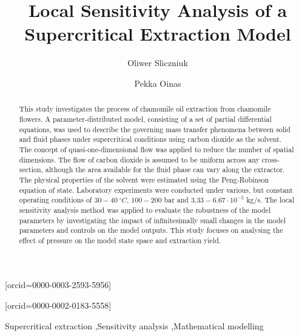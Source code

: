 \documentclass[a4paper,fleqn]{cas-dc}
\begin{document}
 
	
	\title[mode=title]{Local Sensitivity Analysis of a Supercritical Extraction Model}                      
	
	
	\author[1]{Oliwer Sliczniuk}[orcid=0000-0003-2593-5956]
	\cormark[1]
	
	\author[1]{Pekka Oinas}[orcid=0000-0002-0183-5558]
	
	
	\address[1]{Aalto University, School of Chemical Engineering, Espoo, 02150, Finland}
	
	
	\begin{abstract}
		This study investigates the process of chamomile oil extraction from chamomile flowers. A parameter-distributed model, consisting of a set of partial differential equations, was used to describe the governing mass transfer phenomena between solid and fluid phases under supercritical conditions using carbon dioxide as the solvent. The concept of quasi-one-dimensional flow was applied to reduce the number of spatial dimensions. The flow of carbon dioxide is assumed to be uniform across any cross-section, although the area available for the fluid phase can vary along the extractor. The physical properties of the solvent were estimated using the Peng-Robinson equation of state. Laboratory experiments were conducted under various, but constant operating conditions of $30 - 40~^\circ C$, $100 - 200$ bar and $3.33-6.67 \cdot 10^{-5}$ kg/s. The local sensitivity analysis method was applied to evaluate the robustness of the model parameters by investigating the impact of infinitesimally small changes in the model parameters and controls on the model outputs. This study focuses on analysing the effect of pressure on the model state space and extraction yield.
		
	\end{abstract}
	
	\begin{keywords}
		Supercritical extraction \sep Sensitivity analysis \sep Mathematical modelling
	\end{keywords}
	
\end{document}
